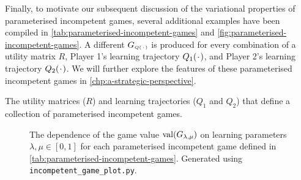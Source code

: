     Finally, to motivate our subsequent discussion of the variational properties of parameterised incompetent games, several additional examples have been compiled in \autoref{tab:parameterised-incompetent-games} and \autoref{fig:parameterised-incompetent-games}.
    A different $G_\ms{Q(\funcdot)}$ is produced for every combination of a utility matrix $R$, Player 1's learning trajectory $Q_1(\funcdot)$, and Player 2's learning trajectory $Q_2(\funcdot)$.
    We will further explore the features of these parameterised incompetent games in \autoref{chp:a-strategic-perspective}.
    
    \begin{table}[b]
        \centering
        \caption[Collection of Parameterised Incompetent Games]{The utility matrices ($R$) and learning trajectories ($Q_1$ and $Q_2$) that define a collection of parameterised incompetent games.}
        \label{tab:parameterised-incompetent-games}
        
    \end{table}



    \begin{figure}[p]
        \centerfloat
        \begin{minipage}{\textwidth + 1.5in}
            \subbottom[\label{fig:parameterised-incompetent-games-a}]%
                {}
            \hfill
            \subbottom[\label{fig:parameterised-incompetent-games-b}]%
                {}

            \subbottom[\label{fig:parameterised-incompetent-games-c}]%
                {}
            \hfill
            \subbottom[\label{fig:parameterised-incompetent-games-d}]%
                {}

            \subbottom[\label{fig:parameterised-incompetent-games-e}]%
                {}
            \hfill
            \subbottom[\label{fig:parameterised-incompetent-games-f}]%
                {}
        \caption[Game Values of Parameterised Incompetent Games]{The dependence of the game value $\operatorname{val}(G_{\lambda, \mu})$ on learning parameters $\lambda, \mu \in [0, 1]$ for each parameterised incompetent game defined in \autoref{tab:parameterised-incompetent-games}. Generated using \texttt{incompetent\_game\_plot.py}.}
        \label{fig:parameterised-incompetent-games}
        \end{minipage}
    \end{figure}